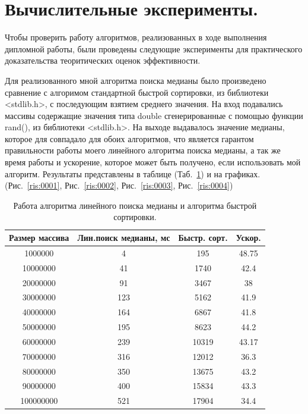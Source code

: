 \documentclass[12pt,a4paper]{article}
\begin{document}

\newpage
\section{Вычислительные эксперименты.}
Чтобы проверить работу алгоритмов, реализованных в ходе выполнения дипломной работы, были проведены следующие эксперименты для практического доказательства теоритических оценок эффективности.\par
Для реализованного мной алгоритма поиска медианы было произведено сравнение с алгоримом стандартной быстрой сортировки, из библиотеки <stdlib.h>, с последующим взятием среднего значения. На вход подавались массивы содержащие значения типа double сгенерированные с помощью функции rand(), из библиотеки <stdlib.h>. На выходе выдавалось значение медианы, которое для совпадало для обоих алгоритмов, что является гарантом правильности работы моего линейного алгоритма поиска медианы, а так же время работы и ускорение, которое может быть получено, если использовать мой алгоритм. Результаты представлены в таблице (Таб.~\ref{tab:Med}) и на графиках.(Рис.~\ref{ris:0001}, Рис.~\ref{ris:0002}, Рис.~\ref{ris:0003}, Рис.~\ref{ris:0004})

\begin{table}[h!]
\caption{\label{tab:Med}Работа алгоритма линейного поиска медианы и алгоритма быстрой сортировки.}
\begin{center}
\begin{tabular}{|c|c|c|c|}
\hline
Размер массива & Лин.поиск медианы, мс  & Быстр. сорт. & Ускор.\\
\hline
1000000 & 4 & 195 & 48.75    \\
\hline
10000000& 41& 1740 & 42.4    \\
\hline
20000000 & 91 & 3467 & 38    \\
\hline
30000000 & 123 & 5162 & 41.9   \\
\hline
40000000 & 164 & 6867 & 41.8   \\
\hline
50000000 & 195 & 8623 & 44.2  \\
\hline
60000000 & 239 & 10319 & 43.17   \\
\hline
70000000 & 316 & 12012 & 36.3   \\
\hline
80000000 & 350 & 13675 & 43.2 \\
\hline
90000000 & 400 & 15834 & 43.3   \\
\hline
100000000 & 521 & 17904 & 34.4  \\
\hline
\end{tabular}
\end{center}
\end{table} 
\end{document}
